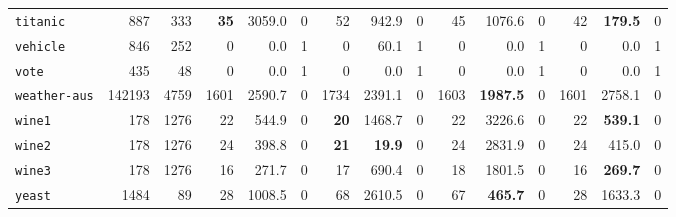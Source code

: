 \begin{tabular}{lccrrrrrrrrrrrr}
\texttt{titanic} & \multicolumn{1}{r}{887} & \multicolumn{1}{r}{333}  & \textbf{35} & 3059.0 & 0 & 52 & 942.9 & 0 & 45 & 1076.6 & 0 & 42 & \textbf{179.5} & 0\\
\texttt{vehicle} & \multicolumn{1}{r}{846} & \multicolumn{1}{r}{252}  & 0 & 0.0 & 1 & 0 & 60.1 & 1 & 0 & 0.0 & 1 & 0 & 0.0 & 1\\
\texttt{vote} & \multicolumn{1}{r}{435} & \multicolumn{1}{r}{48}  & 0 & 0.0 & 1 & 0 & 0.0 & 1 & 0 & 0.0 & 1 & 0 & 0.0 & 1\\
\texttt{weather-aus} & \multicolumn{1}{r}{142193} & \multicolumn{1}{r}{4759}  & 1601 & 2590.7 & 0 & 1734 & 2391.1 & 0 & 1603 & \textbf{1987.5} & 0 & 1601 & 2758.1 & 0\\
\texttt{wine1} & \multicolumn{1}{r}{178} & \multicolumn{1}{r}{1276}  & 22 & 544.9 & 0 & \textbf{20} & 1468.7 & 0 & 22 & 3226.6 & 0 & 22 & \textbf{539.1} & 0\\
\texttt{wine2} & \multicolumn{1}{r}{178} & \multicolumn{1}{r}{1276}  & 24 & 398.8 & 0 & \textbf{21} & \textbf{19.9} & 0 & 24 & 2831.9 & 0 & 24 & 415.0 & 0\\
\texttt{wine3} & \multicolumn{1}{r}{178} & \multicolumn{1}{r}{1276}  & 16 & 271.7 & 0 & 17 & 690.4 & 0 & 18 & 1801.5 & 0 & 16 & \textbf{269.7} & 0\\
\texttt{yeast} & \multicolumn{1}{r}{1484} & \multicolumn{1}{r}{89}  & 28 & 1008.5 & 0 & 68 & 2610.5 & 0 & 67 & \textbf{465.7} & 0 & 28 & 1633.3 & 0\\
\bottomrule
\end{tabular}
